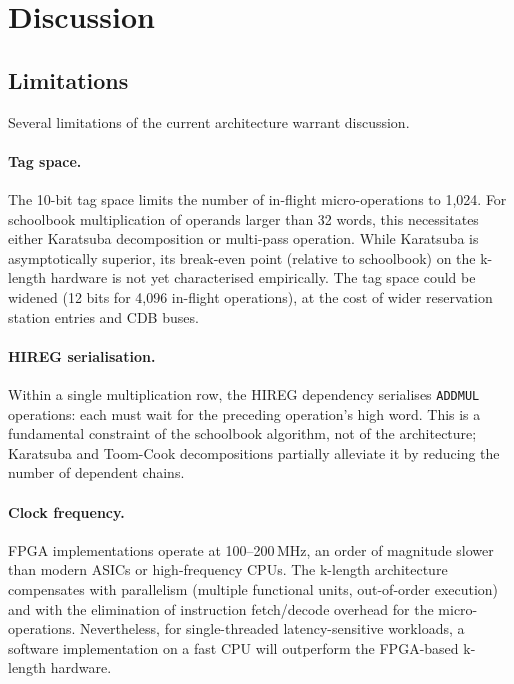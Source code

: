 \documentclass[11pt,a4paper]{article}
\begin{document}
\section{Discussion}
\label{sec:discussion}

\subsection{Limitations}
\label{sec:limitations}

Several limitations of the current architecture warrant discussion.

\paragraph{Tag space.}
The 10-bit tag space limits the number of in-flight micro-operations to
1,024.  For schoolbook multiplication of operands larger than 32 words,
this necessitates either Karatsuba decomposition or multi-pass operation.
While Karatsuba is asymptotically superior, its break-even point (relative
to schoolbook) on the k-length hardware is not yet characterised empirically.
The tag space could be widened (12 bits for 4,096 in-flight operations), at
the cost of wider reservation station entries and CDB buses.

\paragraph{HIREG serialisation.}
Within a single multiplication row, the HIREG dependency serialises
\texttt{ADDMUL} operations: each must wait for the preceding operation's
high word.  This is a fundamental constraint of the schoolbook algorithm,
not of the architecture; Karatsuba and Toom-Cook decompositions partially
alleviate it by reducing the number of dependent chains.

\paragraph{Clock frequency.}
FPGA implementations operate at 100--200\,MHz, an order of magnitude slower
than modern ASICs or high-frequency CPUs.  The k-length architecture
compensates with parallelism (multiple functional units, out-of-order
execution) and with the elimination of instruction fetch/decode overhead for
the micro-operations.  Nevertheless, for single-threaded latency-sensitive
workloads, a software implementation on a fast CPU will outperform the
FPGA-based k-length hardware.
\end{document}
